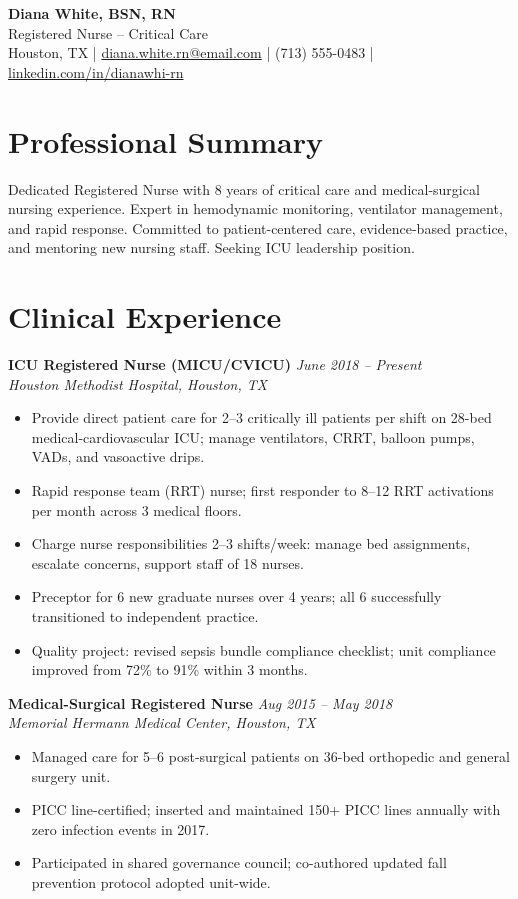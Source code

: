 \documentclass[11pt,a4paper]{article}
\begin{document}
\begin{center}
  {\LARGE \textbf{Diana White, BSN, RN}}\\[3pt]
  Registered Nurse -- Critical Care\\[4pt]
  Houston, TX \quad|\quad
  \href{mailto:diana.white.rn@email.com}{diana.white.rn@email.com} \quad|\quad
  (713) 555-0483 \quad|\quad
  \href{https://linkedin.com/in/dianawhi-rn}{linkedin.com/in/dianawhi-rn}
\end{center}

\section{Professional Summary}
Dedicated Registered Nurse with 8 years of critical care and medical-surgical nursing experience. Expert in hemodynamic monitoring, ventilator management, and rapid response. Committed to patient-centered care, evidence-based practice, and mentoring new nursing staff. Seeking ICU leadership position.

\section{Clinical Experience}

\noindent\textbf{ICU Registered Nurse (MICU/CVICU)} \hfill \textit{June 2018 -- Present}\\
\textit{Houston Methodist Hospital, Houston, TX}
\begin{itemize}
  \item Provide direct patient care for 2--3 critically ill patients per shift on 28-bed medical-cardiovascular ICU; manage ventilators, CRRT, balloon pumps, VADs, and vasoactive drips.
  \item Rapid response team (RRT) nurse; first responder to 8--12 RRT activations per month across 3 medical floors.
  \item Charge nurse responsibilities 2--3 shifts/week: manage bed assignments, escalate concerns, support staff of 18 nurses.
  \item Preceptor for 6 new graduate nurses over 4 years; all 6 successfully transitioned to independent practice.
  \item Quality project: revised sepsis bundle compliance checklist; unit compliance improved from 72\% to 91\% within 3 months.
\end{itemize}

\vspace{4pt}
\noindent\textbf{Medical-Surgical Registered Nurse} \hfill \textit{Aug 2015 -- May 2018}\\
\textit{Memorial Hermann Medical Center, Houston, TX}
\begin{itemize}
  \item Managed care for 5--6 post-surgical patients on 36-bed orthopedic and general surgery unit.
  \item PICC line-certified; inserted and maintained 150+ PICC lines annually with zero infection events in 2017.
  \item Participated in shared governance council; co-authored updated fall prevention protocol adopted unit-wide.
\end{itemize}
\end{document}
